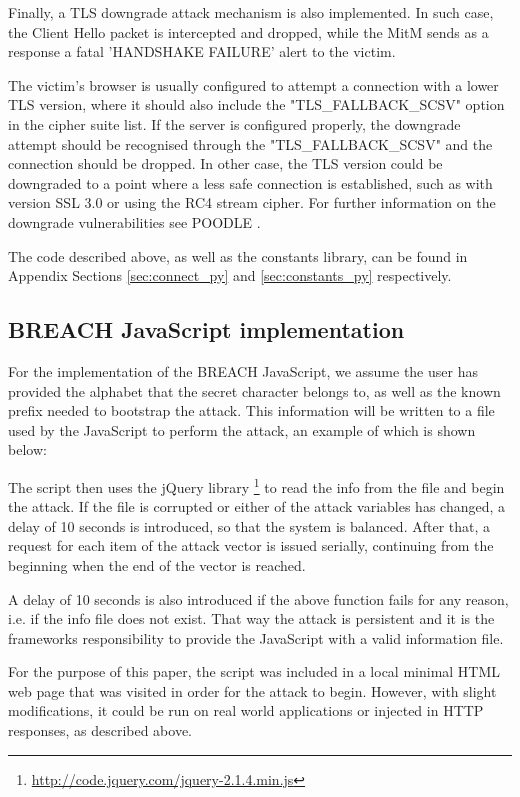 Finally, a TLS downgrade attack mechanism is also implemented. In such case, the
Client Hello packet is intercepted and dropped, while the MitM sends as a
response a fatal 'HANDSHAKE FAILURE' alert to the victim.

The victim's browser is usually configured to attempt a connection with a lower
TLS version, where it should also include the "TLS\_FALLBACK\_SCSV" option in the
cipher suite list. If the server is configured properly, the downgrade attempt
should be recognised through the "TLS\_FALLBACK\_SCSV" and the connection should
be dropped. In other case, the TLS version could be downgraded to a point where
a less safe connection is established, such as with version SSL 3.0 or using the
RC4 stream cipher. For further information on the downgrade vulnerabilities see
POODLE \cite{poodle}.

The code described above, as well as the constants library, can be found in
Appendix Sections \ref{sec:connect_py} and \ref{sec:constants_py} respectively.

\subsection{BREACH JavaScript implementation}

For the implementation of the BREACH JavaScript, we assume the user has provided
the alphabet that the secret character belongs to, as well as the known prefix
needed to bootstrap the attack. This information will be written to a file used
by the JavaScript to perform the attack, an example of which is shown below:


The script then uses the jQuery library
\footnote{\url{http://code.jquery.com/jquery-2.1.4.min.js}} to read the info
from the file and begin the attack. If the file is corrupted or either of the
attack variables has changed, a delay of 10 seconds is introduced, so that the
system is balanced. After that, a request for each item of the attack vector is
issued serially, continuing from the beginning when the end of the vector is
reached.

A delay of 10 seconds is also introduced if the above function fails for any
reason, i.e. if the info file does not exist. That way the attack is persistent
and it is the frameworks responsibility to provide the JavaScript with a valid
information file.

For the purpose of this paper, the script was included in a local minimal HTML
web page that was visited in order for the attack to begin. However, with slight
modifications, it could be run on real world applications or injected in HTTP
responses, as described above.

